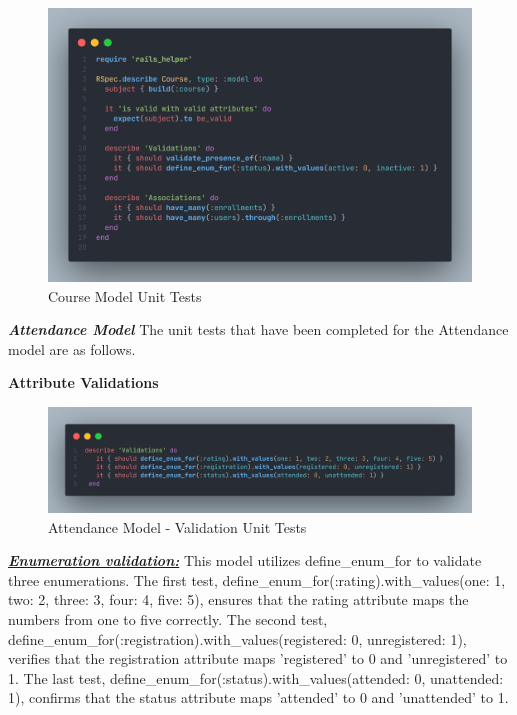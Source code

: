 \begin{justify}
    \begin{figure}[H]
        \centerline{\includegraphics[width=140mm,scale=1]{figures/implementation_and_testing/testing/AUT/course/all.png}}
        \caption{Course Model Unit Tests}
        \label{Course Model Unit Tests}
    \end{figure}






\newendline \textbf{\textit{Attendance Model}}\newendline
The unit tests that have been completed for the Attendance model are as follows.

\vspace{0.25cm}
\newendline
\textbf{Attribute Validations}

    \begin{figure}[H]
        \centerline{\includegraphics[width=140mm,scale=1]{figures/implementation_and_testing/testing/AUT/attendance/validations.png}}
        \caption{Attendance Model - Validation Unit Tests}
        \label{Attendance Model - Validation Unit Tests}
    \end{figure}

\vspace{0.25cm}
\noindent\textbf{\textit{\underline{Enumeration validation:}}} This model utilizes define\_enum\_for to validate three enumerations. The first test, define\_enum\_for(:rating).with\_values(one: 1, two: 2, three: 3, four: 4, five: 5), ensures that the rating attribute maps the numbers from one to five correctly. The second test, define\_enum\_for(:registration).with\_values(registered: 0, unregistered: 1), verifies that the registration attribute maps 'registered' to 0 and 'unregistered' to 1. The last test, define\_enum\_for(:status).with\_values(attended: 0, unattended: 1), confirms that the status attribute maps 'attended' to 0 and 'unattended' to 1.


\end{justify}
